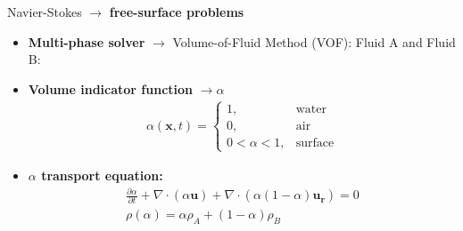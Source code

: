 \begin{frame}
{\large Navier-Stokes $\rightarrow$ \textbf{free-surface problems}}
\begin{itemize}
\item<2-> \textbf{Multi-phase solver} $\rightarrow$ Volume-of-Fluid Method (VOF): Fluid A and Fluid B:
\item<3-> \textbf{Volume indicator function} $\rightarrow \alpha$ 
\begin{align*}
\alpha(\mathbf{x},t)=\begin{cases}
    1, & \text{water}\\
    0, & \text{air}\\
    0<\alpha<1, & \text{surface}
  \end{cases}
\end{align*}
\item<4-> \textbf{$\alpha$ transport equation:}
\begin{align*}
\frac{\partial \alpha}{\partial t} + \nabla \cdot (\alpha \mathbf{u}) + \nabla \cdot (\alpha (1 - \alpha)\mathbf{u_r}) = 0\\
\rho(\alpha) = \alpha\rho_A + (1-\alpha)\rho_B
\end{align*}
\end{itemize}


\end{frame}
\clearpage


